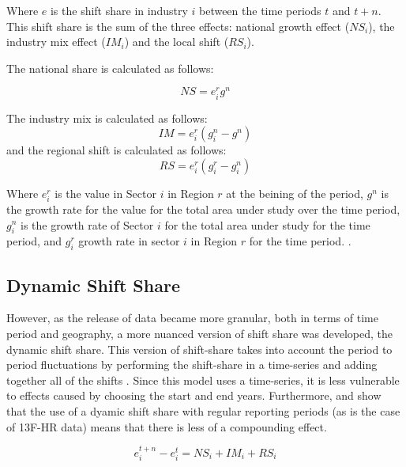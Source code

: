 Where $e$ is the shift share in industry $i$ between the time periods $t$ and $t+n$.  This shift share is the sum of the three effects: national growth effect ($NS_{i}$), the industry mix effect ($IM_{i}$) and the local shift ($RS_{i}$). 

The national share is calculated as follows:

\begin{equation}
    NS = e^{r}_{i}g^{n}
    \label{Eq:NationalShare}
\end{equation}

The industry mix is calculated as follows:
\begin{equation}
    IM = e^{r}_{i}(g^{n}_{i} - g^{n})
    \label{Eq:IndustryMix}
\end{equation}
and the regional shift is calculated as follows: 
\begin{equation}
    RS =  e^{r}_{i}(g^{r}_{i} - g^{n}_{i})
    \label{Eq:RegionalShare}
\end{equation}

Where $e^{r}_{i}$ is the value in Sector $i$ in Region $r$ at the beining of the period, $g^{n}$ is the growth rate for the value for the total area under study over the time period, $g^{n}_{i}$ is the growth rate of Sector $i$ for the total area under study for the time period, and $g^{r}_{i}$ growth rate in sector $i$ in Region $r$ for the time period. \citep{Houston67}. 

\subsection{Dynamic Shift Share}

However, as the release of data became more granular, both in terms of time period and geography, a more nuanced version of shift share was developed, the dynamic shift share.  This version of shift-share takes into account the period to period fluctuations by performing the shift-share in a time-series and adding together all of the shifts \citep{BarffKnight88}.  Since this model uses a time-series, it is less vulnerable to effects caused by choosing the start and end years. Furthermore, \cite{BarffKnight88} and \cite{harris1994dynamic} show that the use of a dyamic shift share with regular reporting periods (as is the case of 13F-HR data) means that there is less of a compounding effect.   

\begin{equation}
    e^{t+n}_{i} - e^{t}_{i} = NS_{i} + IM_{i} + RS_{i}
\end{equation}

